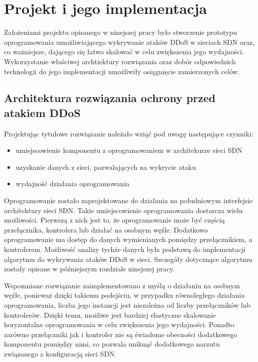 \chapter{Projekt i jego implementacja}

Założeniami projektu opisanego w ninejszej pracy było stworzenie prototypu
oprogramowania umożliwiającego wykrywanie ataków DDoS w sieciach SDN oraz, co
ważniejsze, dającego się łatwo skalować w celu zwiększenia jego wydajności.
Wykorzystanie właściwej archtiektury rozwiązania oraz dobór odpowiednich
technologii do jego implementacji umożliwiły osiągnięcie zamierzonych celów.

\section{Architektura rozwiązania ochrony przed atakiem DDoS}

Projektując tytułowe rozwiązanie należało wziąć pod uwagę następujące czynniki:
\begin{itemize}
  \item umiejscowienie komponentu z oprogramowaniem w architekurze sieci SDN
  \item uzyskanie danych z sieci, pozwalających na wykrycie ataku
  \item wydajność działania oprogramowania
\end{itemize}

Oprogramowanie zostało zaprojektowane do działania na południowym interfejsie
architektury sieci SDN. Takie umiejscowienie oprogramowania dostarcza wielu
możliwości. Pierwszą z nich jest to, że oprogramowanie może być częścią
przełącznika, kontrolera lub działać na osobnym węźle. Dodatkowo oprogramowanie
ma dostęp do danych wymienianych pomiędzy przełącznikiem, a kontrolerem.
Możliwość analizy tychże danych była podstawą do implementacji algorytmu do
wykrywania ataków DDoS w sieci. Szczegóły dotycznące algorytmu zostały opisane w
późniejszym rozdziale ninejszej pracy.

Wspomniane rozwiązanie zaimplementowano z myślą o działaniu na osobnym węźle,
ponieważ dzięki takiemu podejściu, w przypadku równoległego działania
oprogramowania, liczba jego instancji jest niezależna od liczby przełączników
lub kontrolerów. Dzięki temu, możliwe jest bardziej elastyczne skalowanie
horyzontalne oprogramowania w celu zwiększenia jego wydajności. Ponadto zarówno
przełączniki jak i kontroler nie są świadome obecności dodatkowego komponentu
pomiędzy nimi, co pozwala uniknąć dodatkowego narzutu związanego z konfiguracją
sieci SDN. 

